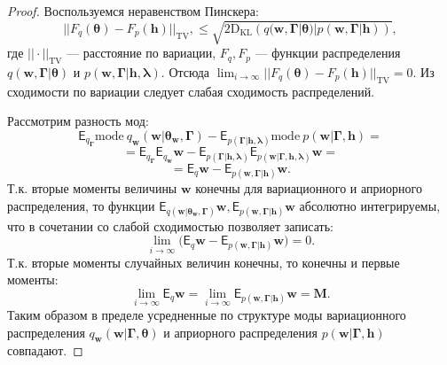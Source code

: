 \begin{proof}
Воспользуемся неравенством Пинскера:
\[
    ||F_q(\boldsymbol{\theta})-F_p(\mathbf{h})||_\text{TV},\leq\sqrt{2\text{D}_\text{KL}\left(q(\mathbf{w}, \boldsymbol{\Gamma}|\boldsymbol{\theta})|p(\mathbf{w}, \boldsymbol{\Gamma}|\mathbf{h})\right)},
\]
где $||\cdot||_\text{TV}$ --- расстояние по вариации, $F_q, F_p$ --- функции распределения   $q(\mathbf{w},\boldsymbol{\Gamma}|\boldsymbol{\theta})$ и $p(\mathbf{w},\boldsymbol{\Gamma}| \mathbf{h}, \boldsymbol{\lambda})$.
Отсюда $ \lim_{i \to \infty} ||F_q(\boldsymbol{\theta})-F_p(\mathbf{h})||_\text{TV} = 0.$
Из сходимости по вариации следует слабая сходимость распределений.

Рассмотрим разность мод:
\[
\mathsf{E}_{q_{\boldsymbol{\Gamma}}}\text{mode}~q_{\mathbf{w}}(\mathbf{w}|\boldsymbol{\theta}_\mathbf{w},\boldsymbol{\Gamma})-\mathsf{E}_{p(\boldsymbol{\Gamma}|\mathbf{h}, \boldsymbol{\lambda})} \text{mode}~p(\mathbf{w}|\boldsymbol{\Gamma}, \mathbf{h}) = 
\]
\[
=\mathsf{E}_{q_{\boldsymbol{\Gamma}}} \mathsf{E}_{q_\mathbf{w}} \mathbf{w}-\mathsf{E}_{p(\boldsymbol{\Gamma}|\mathbf{h}, \boldsymbol{\lambda})} \mathsf{E}_{p(\mathbf{w}| \boldsymbol{\Gamma}, \mathbf{h}, \boldsymbol{\lambda})} \mathbf{w} =
\]
\[
= \mathsf{E}_{q}\mathbf{w}-\mathsf{E}_{p(\mathbf{w},\boldsymbol{\Gamma}|\mathbf{h})}\mathbf{w}.
\]
Т.к. вторые моменты величины $\mathbf{w}$ конечны для вариационного и априорного распределения, то функции $\mathsf{E}_{q(\mathbf{w}|\boldsymbol{\theta}_\mathbf{w},\boldsymbol{\Gamma})}\mathbf{w}, \mathsf{E}_{p(\mathbf{w},\boldsymbol{\Gamma}| \mathbf{h})}\mathbf{w}$ абсолютно интегрируемы, что в сочетании со слабой сходимостью позволяет записать:
\[
  \lim_{i \to \infty}\bigl( \mathsf{E}_{q}\mathbf{w}- \mathsf{E}_{p(\mathbf{w},\boldsymbol{\Gamma}|\mathbf{h})}\mathbf{w} \bigr) = 0.
\]
Т.к. вторые моменты случайных величин конечны, то конечны и первые моменты:
\[
  \lim_{i \to \infty} \mathsf{E}_{q}\mathbf{w}= \lim_{i \to \infty}\mathsf{E}_{p(\mathbf{w},\boldsymbol{\Gamma}|\mathbf{h})}\mathbf{w} = \mathbf{M}.
\]
Таким образом в пределе усредненные по структуре моды вариационного распределения $q_\mathbf{w}(\mathbf{w}|\boldsymbol{\Gamma}, \boldsymbol{\theta})$ и априорного распределения $p(\mathbf{w}|\boldsymbol{\Gamma}, \mathbf{h})$ совпадают.

\end{proof}
